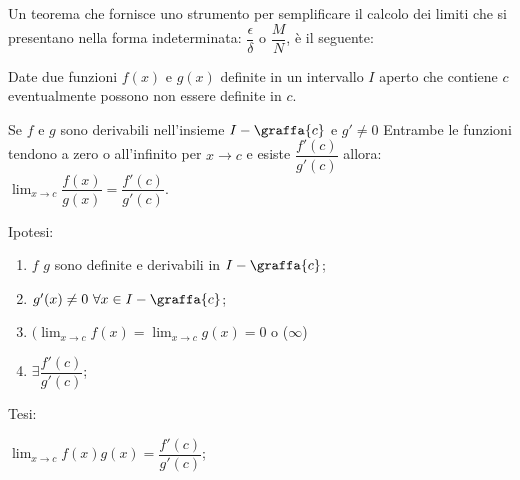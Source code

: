 Un teorema che fornisce uno strumento per semplificare il calcolo dei 
limiti che si presentano nella forma indeterminata: 
\(\dfrac{\epsilon}{\delta}\) o \(\dfrac{M}{N}\), è il seguente:

\begin{teorema}[De L'H\^opital]

Date due funzioni \(f(x)\) e \(g(x)\) definite in un intervallo \(I\) 
aperto che contiene \(c\) eventualmente possono non essere definite in 
\(c\).

Se \(f\) e \(g\) sono derivabili nell'insieme \(I-\graffa{c}\) e 
\(g' \neq 0\) Entrambe le funzioni tendono a zero o all'infinito per 
\(x \to c\) e
esiste \(\dfrac{f'(c)}{g'(c)}\) allora:
\(\displaystyle \lim_{x \to c} \dfrac{f(x)}{g(x)}=\dfrac{f'(c)}{g'(c)}\).
\end{teorema}

\noindent Ipotesi: 
\begin{enumerate}[nosep]
 \item \(f\) \(g\) sono definite e derivabili in \(I-\graffa{c}\);
 \item \(g'(x)\neq 0 ~ \forall x \in I-\graffa{c}\); 
 \item \((\displaystyle \lim_{x \to c}{f(x)}=
          \lim_{x \to c}{g(x)}=0\) o (\(\infty\))
 \item \(\exists \dfrac{f'(c)}{g'(c)}\); 
\end{enumerate}

\noindent Tesi: 

\(\displaystyle \lim_{x \to c}{f(x)}{g(x)}=\dfrac{f'(c)}{g'(c)}\); 

% 












